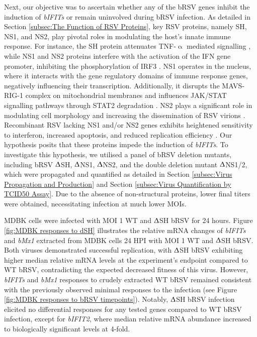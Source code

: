 Next, our objective was to ascertain whether any of the bRSV genes inhibit the induction of \textit{bIFITs} or remain uninvolved during bRSV infection. As detailed in Section \ref{subsec:The Function of RSV Proteins}, key RSV proteins, namely SH, NS1, and NS2, play pivotal roles in modulating the host's innate immune response. For instance, the SH protein attenuates TNF-$\upalpha$ mediated signalling \cite{Fuentes2007FunctionProtein}, while NS1 and NS2 proteins interfere with the activation of the IFN gene promoter, inhibiting the phosphorylation of IRF3 \cite{Spann2005EffectsCytokines, Wright2006TheHumans}. NS1 operates in the nucleus, where it interacts with the gene regulatory domains of immune response genes, negatively influencing their transcription. Additionally, it disrupts the MAVS-RIG-1 complex on mitochondrial membranes and influences JAK/STAT signalling pathways through STAT2 degradation \cite{Pei2021Nuclear-localizedTranscription, Boyapalle2012RespiratoryInfection, Wright2006TheHumans}. NS2 plays a significant role in modulating cell morphology and increasing the dissemination of RSV virions \cite{Sedeyn2019RespiratoryResponses, Liesman2014RSV-encodedObstruction}. Recombinant RSV lacking NS1 and/or NS2 genes exhibits heightened sensitivity to interferon, increased apoptosis, and reduced replication efficiency \cite{Whitehead1999RecombinantChimpanzees, Teng2000RecombinantChimpanzees}. Our hypothesis posits that these proteins impede the induction of \textit{bIFITs}. To investigate this hypothesis, we utilised a panel of bRSV deletion mutants, including bRSV $\Updelta$SH, $\Updelta$NS1, $\Updelta$NS2, and the double deletion mutant $\Updelta$NS1/2, which were propagated and quantified as detailed in Section \ref{subsec:Virus Propagation and Production} and Section \ref{subsec:Virus Quantification by TCID50 Assay}. Due to the absence of non-structural proteins, lower final titers were obtained, necessitating infection at much lower MOIs. 

MDBK cells were infected with MOI 1 WT and $\Updelta$SH bRSV for 24 hours. Figure \ref{fig:MDBK responses to dSH} illustrates the relative mRNA changes of \textit{bIFITs} and \textit{bMx1} extracted from MDBK cells 24 HPI with MOI 1 WT and $\Updelta$SH bRSV. Both viruses demonstrated successful replication, with $\Updelta$SH bRSV exhibiting higher median relative mRNA levels at the experiment's endpoint compared to WT bRSV, contradicting the expected decreased fitness of this virus. However, \textit{bIFITs} and \textit{bMx1} responses to crudely extracted WT bRSV remained consistent with the previously observed minimal responses to the infection (see Figure \ref{fig:MDBK responses to bRSV timepoints}). Notably, $\Updelta$SH bRSV infection elicited no differential responses for any tested genes compared to WT bRSV infection, except for \textit{bIFIT2}, where median relative mRNA abundance increased to biologically significant levels at 4-fold.

